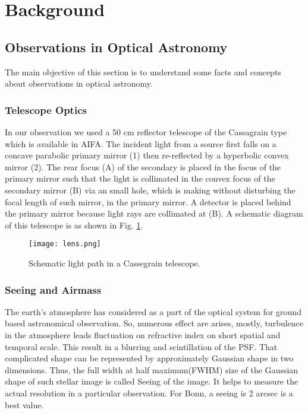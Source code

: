 \section{Background}
\subsection{Observations in Optical Astronomy}
The main objective of this section is to understand some facts and concepts about observations in optical astronomy.

\subsubsection{Telescope Optics}
In our observation we used a 50 cm reflector telescope of the Cassagrain type which is available in AIFA. The incident light from a source first falls on a concave parabolic primary mirror (1) then re-reflected by a hyperbolic convex mirror (2). The rear focus (A) of the secondary is placed in the focus of the primary mirror such that the light is collimated in the convex focus of the secondary mirror (B) via an small hole, which is making without disturbing the focal length of such mirror, in the primary mirror. A detector is placed behind the primary mirror because light rays are collimated at (B). A schematic diagram of this telescope is as shown in Fig. \ref{Fig:telescope}.
\begin{figure}[H]
	\centering
	\texttt{[image: lens.png]}
	\caption{Schematic light path in a Cassegrain telescope\cite{manual}.}%
	\label{Fig:telescope}	
\end{figure}

%
\subsubsection{Seeing and Airmass}
The earth's atmosphere has considered as a part of the optical system for ground based astronomical observation. So, numerous effect are arises, mostly, turbulence in the atmosphere leads fluctuation on refractive index on short spatial and temporal scale. This result in a blurring and scintillation of the PSF. That complicated shape can be represented by approximately Gaussian shape in two dimensions. Thus, the full width at half maximum(FWHM) size of the Gaussian shape of such stellar image is called Seeing of the image. It helps to measure the actual resolution in a particular observation. For Bonn, a seeing is 2 arcsec is a best value.\\


